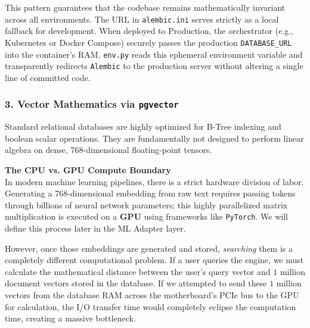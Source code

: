This pattern guarantees that the codebase remains mathematically invariant across all environments. The URL in \texttt{alembic.ini} serves strictly as a local fallback for development. When deployed to Production, the orchestrator (e.g., Kubernetes or Docker Compose) securely passes the production \texttt{DATABASE\_URL} into the container's RAM. \texttt{env.py} reads this ephemeral environment variable and transparently redirects \texttt{Alembic} to the production server without altering a single line of committed code.


\subsubsection*{3. Vector Mathematics via \texttt{pgvector}}




Standard relational databases are highly optimized for B-Tree indexing and boolean scalar operations. They are fundamentally not designed to perform linear algebra on dense, 768-dimensional floating-point tensors.

\textbf{The CPU vs. GPU Compute Boundary} \\
In modern machine learning pipelines, there is a strict hardware division of labor. Generating a 768-dimensional embedding from raw text requires passing tokens through billions of neural network parameters; this highly parallelized matrix multiplication is executed on a \textbf{GPU} using frameworks like \texttt{PyTorch}. We will define this process later in the ML Adapter layer.

However, once those embeddings are generated and stored, \textit{searching} them is a completely different computational problem. If a user queries the engine, we must calculate the mathematical distance between the user's query vector and $1$ million document vectors stored in the database. If we attempted to send these $1$ million vectors from the database RAM across the motherboard's PCIe bus to the GPU for calculation, the I/O transfer time would completely eclipse the computation time, creating a massive bottleneck.


